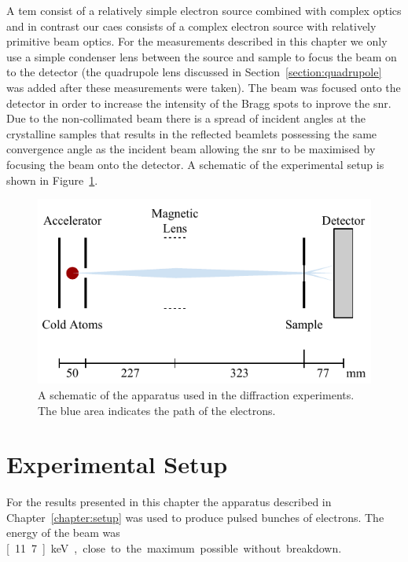 A \gls{tem} consist of a relatively simple electron source combined with complex optics and in contrast our \gls{caes} consists of a complex electron source with relatively primitive beam optics.
For the measurements described in this chapter we only use a simple condenser lens between the source and sample to focus the beam on to the detector (the quadrupole lens discussed in Section~\ref{section:quadrupole} was added after these measurements were taken).
The beam was focused onto the detector in order to increase the intensity of the Bragg spots to inprove the \gls{snr}.
Due to the non-collimated beam there is a spread of incident angles at the crystalline samples that results in the reflected beamlets possessing the same convergence angle as the incident beam allowing the \gls{snr} to be maximised by focusing the beam onto the detector.
A schematic of the experimental setup is shown in Figure~\ref{figure:diffraction_geometry}.

\begin{figure}
    \center
    \includegraphics{part2/Figs/DiffractionGeometry.pdf}
    \caption[A schematic of the apparatus used for diffraction experiments.]{A schematic of the apparatus used in the diffraction experiments. The blue area indicates the path of the electrons.}
    \label{figure:diffraction_geometry}
\end{figure}

\section{Experimental Setup}

For the results presented in this chapter the apparatus described in Chapter~\ref{chapter:setup} was used to produce pulsed bunches of electrons.
The energy of the beam was \unit[11.7]{keV}, close to the maximum possible without breakdown.

